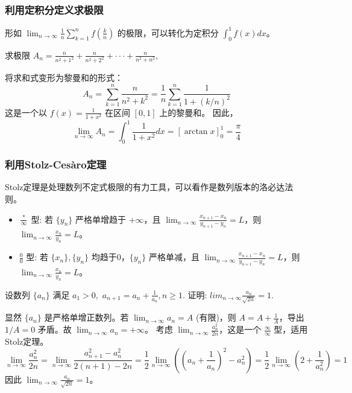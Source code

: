 \documentclass[lang=cn,newtx,10pt,scheme=chinese]{elegantbook}
\begin{document}
\subsubsection{利用定积分定义求极限}
形如 $\lim_{n\to\infty} \frac{1}{n} \sum_{k=1}^n f(\frac{k}{n})$ 的极限，可以转化为定积分 $\int_0^1 f(x) dx$。
\begin{problem}[CMC真题]
    求极限 $A_{n}=\frac{n}{n^{2}+1^{2}}+\frac{n}{n^{2}+2^{2}}+\cdot\cdot\cdot+\frac{n}{n^{2}+n^{2}},$
\end{problem}
\begin{solution}
    将求和式变形为黎曼和的形式：
    \begin{equation*}
        A_n = \sum_{k=1}^n \frac{n}{n^2+k^2} = \frac{1}{n} \sum_{k=1}^n \frac{1}{1+(k/n)^2}
    \end{equation*}
    这是一个以 $f(x) = \frac{1}{1+x^2}$ 在区间 $[0,1]$ 上的黎曼和。
    因此，
    \begin{equation*}
        \lim_{n\to\infty} A_n = \int_0^1 \frac{1}{1+x^2} dx = [\arctan x]_0^1 = \frac{\pi}{4}
    \end{equation*}
\end{solution}

\subsubsection{利用Stolz-Cesàro定理}
Stolz定理是处理数列不定式极限的有力工具，可以看作是数列版本的洛必达法则。
\begin{itemize}
    \item $\frac{*}{\infty}$ 型: 若 $\{y_n\}$ 严格单增趋于 $+\infty$，且 $\lim_{n\to\infty} \frac{x_{n+1}-x_n}{y_{n+1}-y_n} = L$，则 $\lim_{n\to\infty} \frac{x_n}{y_n} = L$。
    \item $\frac{0}{0}$ 型: 若 $\{x_n\}, \{y_n\}$ 均趋于0，$\{y_n\}$ 严格单减，且 $\lim_{n\to\infty} \frac{x_{n+1}-x_n}{y_{n+1}-y_n} = L$，则 $\lim_{n\to\infty} \frac{x_n}{y_n} = L$。
\end{itemize}
\begin{problem}[CMC真题]
 设数列 $\{a_{n}\}$ 满足 $a_{1}>0,$ $a_{n+1}=a_{n}+\frac{1}{a_{n}},n\ge1.$ 证明:
$lim_{n\rightarrow\infty}\frac{a_{n}}{\sqrt{2n}}=1.$
\end{problem}
\begin{solution}
    显然 $\{a_n\}$ 是严格单增正数列。若 $\lim_{n\to\infty} a_n = A$ (有限)，则 $A=A+\frac{1}{A}$，导出 $1/A=0$ 矛盾。故 $\lim_{n\to\infty} a_n = +\infty$。
    考虑 $\lim_{n\to\infty} \frac{a_n^2}{2n}$，这是一个 $\frac{\infty}{\infty}$ 型，适用Stolz定理。
    \begin{equation*}
        \lim_{n\to\infty} \frac{a_n^2}{2n} = \lim_{n\to\infty} \frac{a_{n+1}^2 - a_n^2}{2(n+1)-2n} = \frac{1}{2}\lim_{n\to\infty} \left( (a_n+\frac{1}{a_n})^2 - a_n^2 \right) = \frac{1}{2}\lim_{n\to\infty} (2 + \frac{1}{a_n^2}) = 1
    \end{equation*}
    因此 $\lim_{n\to\infty} \frac{a_n}{\sqrt{2n}} = 1$。
\end{solution}
\end{document}

